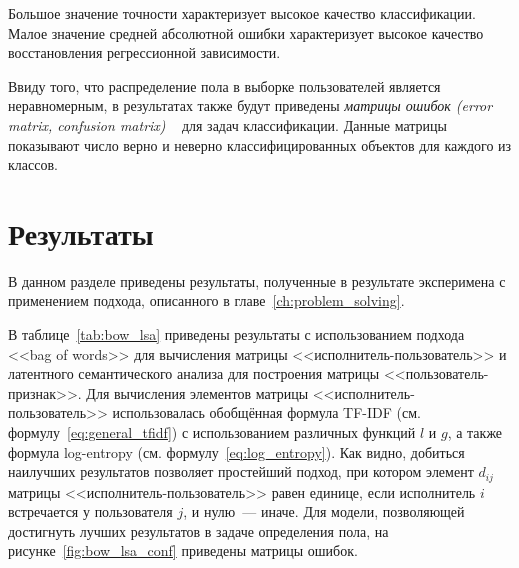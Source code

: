 Большое значение точности характеризует высокое качество классификации.
Малое значение средней абсолютной ошибки характеризует высокое качество
восстановления регрессионной зависимости.

Ввиду того, что распределение пола в выборке пользователей
является неравномерным, в результатах также будут приведены
\textit{матрицы ошибок (error matrix, confusion matrix)
}~\cite{stehman1997selecting} для задач классификации.
Данные матрицы показывают число верно и неверно классифицированных
объектов для каждого из классов.

\section{Результаты}
\label{sec:results}

В данном разделе приведены результаты, полученные в результате
эксперимена с применением подхода, описанного в 
главе~\ref{ch:problem_solving}.

В таблице~\ref{tab:bow_lsa}
приведены результаты с использованием подхода <<bag of words>>
для вычисления матрицы <<исполнитель-пользователь>> и латентного
семантического анализа для построения матрицы <<пользователь-признак>>.
Для вычисления элементов матрицы <<исполнитель-пользователь>> использовалась
обобщённая формула TF-IDF (см. формулу~\ref{eq:general_tfidf}) с
использованием различных функций $l$ и $g$, а также формула
log-entropy (см. формулу~\ref{eq:log_entropy}). Как видно,
добиться наилучших результатов позволяет простейший подход,
при котором элемент $d_{ij}$ матрицы <<исполнитель-пользователь>>
равен единице, если исполнитель $i$ встречается у пользователя $j$,
и нулю~--- иначе. Для модели, позволяющей достигнуть лучших
результатов в задаче определения пола,
на рисунке~\ref{fig:bow_lsa_conf} приведены матрицы ошибок.

